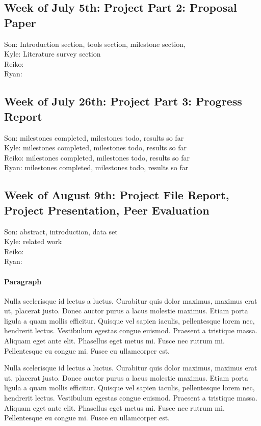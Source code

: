 \documentclass[11pt,sigconf]{acmart}
\begin{document}
\subsection{Week of July 5th: Project Part 2: Proposal Paper}

Son:  Introduction section, tools section, milestone section,  \\
Kyle: Literature survey section \\
Reiko: \\
Ryan: \\

\subsection{Week of July 26th: Project Part 3: Progress Report}

Son: milestones completed, milestones todo, results so far \\
Kyle: milestones completed, milestones todo, results so far \\
Reiko: milestones completed, milestones todo, results so far \\
Ryan: milestones completed, milestones todo, results so far \\

\subsection{Week of August 9th: Project File Report, Project Presentation, Peer Evaluation}

Son: abstract, introduction, data set\\
Kyle: related work\\
Reiko: \\
Ryan: \\


\paragraph{Paragraph}

Nulla scelerisque id lectus a luctus.
Curabitur quis dolor maximus, maximus erat ut, placerat justo.
Donec auctor purus a lacus molestie maximus.
Etiam porta ligula a quam mollis efficitur.
Quisque vel sapien iaculis, pellentesque lorem nec, hendrerit lectus.
Vestibulum egestas congue euismod.
Praesent a tristique massa.
Aliquam eget ante elit.
Phasellus eget metus mi.
Fusce nec rutrum mi.
Pellentesque eu congue mi.
Fusce eu ullamcorper est.

Nulla scelerisque id lectus a luctus.
Curabitur quis dolor maximus, maximus erat ut, placerat justo.
Donec auctor purus a lacus molestie maximus.
Etiam porta ligula a quam mollis efficitur.
Quisque vel sapien iaculis, pellentesque lorem nec, hendrerit lectus.
Vestibulum egestas congue euismod.
Praesent a tristique massa.
Aliquam eget ante elit.
Phasellus eget metus mi.
Fusce nec rutrum mi.
Pellentesque eu congue mi.
Fusce eu ullamcorper est. \cite{veytsmanlatex}



 
\end{document}
